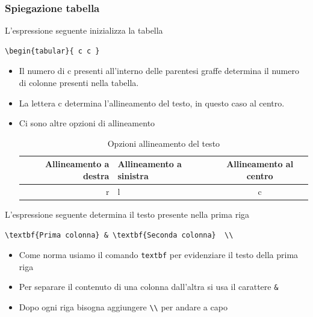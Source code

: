 \subsubsection{Spiegazione tabella}
L'espressione seguente inizializza la tabella
\begin{lstlisting}
\begin{tabular}{ c c }
\end{lstlisting}
\begin{itemize}
\item Il numero di c presenti all'interno delle parentesi graffe determina il numero di colonne presenti nella tabella.
\item La lettera c determina l'allineamento del testo, in questo caso al centro.
\item Ci sono altre opzioni di allineamento

\begin{table}[H]
		\begin{center}
			\setlength{\aboverulesep}{0pt}
			\setlength{\belowrulesep}{0pt}
			\setlength{\extrarowheight}{.75ex}
			\begin{tabular}{ r l c }
				\rowcolor{AzzurroGruppo!30} 
				\textbf{Allineamento a destra} & \textbf{Allineamento a sinistra} & \textbf{Allineamento al centro}  \\
				\toprule
				r & l & c \\
				\bottomrule
			\end{tabular}
			\caption{Opzioni allineamento del testo}
		\end{center}
	\end{table}

\end{itemize}
L'espressione seguente determina il testo presente nella prima riga
\begin{lstlisting}
\textbf{Prima colonna} & \textbf{Seconda colonna}  \\
\end{lstlisting}
\begin{itemize}
\item Come norma usiamo il comando \lstinline[columns=fixed]{textbf} per evidenziare il testo della prima riga
\item Per separare il contenuto di una colonna dall'altra si usa il carattere \lstinline[columns=fixed]{&}
\item Dopo ogni riga bisogna aggiungere \lstinline[columns=fixed]{\\} per andare a capo
\end{itemize}


